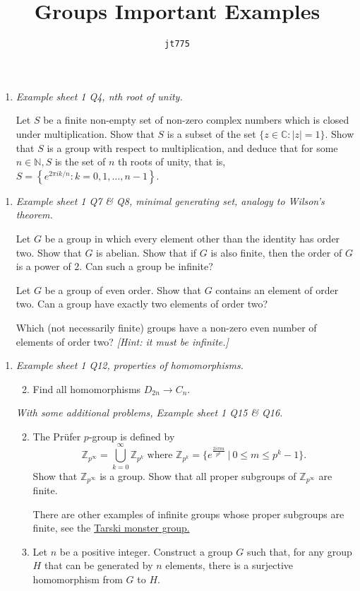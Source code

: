 \documentclass[11pt]{article}
\title{\textbf{Groups Important Examples}}
\author{\texttt{jt775}}
\date{\null}
\newlength{\qspace}
\newcounter{qnumber}
\newenvironment{question}%
 {\vspace{\qspace}
  \begin{enumerate}[\bfseries 1\quad][10]%
    \setcounter{enumi}{\value{qnumber}}%
    \item%
 }
{
  \end{enumerate}
  \filbreak
  \stepcounter{qnumber}
 }
\newenvironment{questionparts}[1][1]%
 {
  \begin{enumerate}[\bfseries (i)]%
    \setcounter{enumii}{#1}
    \addtocounter{enumii}{-1}
    \setlength{\parskip}{3pt}
 }
 {
  \end{enumerate}
 }
\def\le{\leqslant}
\begin{document}
\maketitle
\vspace{-1.5cm}

\begin{question}\textit{Example sheet 1 Q4, nth root of unity.}
    
    Let $S$ be a finite non-empty set of non-zero complex numbers which is closed under multiplication. Show that $S$ is a subset of the set $\{z \in \mathbb{C}:|z|=1\}$. Show that $S$ is a group with respect to multiplication, and deduce that for some $n \in \mathbb{N}, S$ is the set of $n$ th roots of unity, that is, $S=\left\{e^{2 \pi i k / n}: k=0,1, \ldots, n-1\right\}$.
\end{question}

\begin{question}\textit{Example sheet 1 Q7 \& Q8, minimal generating set, analogy to Wilson's theorem.}

  Let $G$ be a group in which every element other than the identity has order two. Show that $G$ is abelian. Show that if $G$ is also finite, then the order of $G$ is a power of 2. Can such a group be infinite?

  Let $G$ be a group of even order. Show that $G$ contains an element of order two. Can a group have exactly two elements of order two? 
  
  Which (not necessarily finite) groups have a non-zero even number of elements of order two? \textit{[Hint: it must be infinite.]}
\end{question}

\begin{question}\textit{Example sheet 1 Q12, properties of homomorphisms.}

  \begin{questionparts}
    \item Find all homomorphisms $ D_{2n}\to C_n $.
  \end{questionparts}

  \textit{With some additional problems, Example sheet 1 Q15 \& Q16.}

  \begin{questionparts}
    \setcounter{enumii}{1}
    \item The Pr\"{u}fer $p$-group is defined by
    \[
      \mathbb{Z}_{p^\infty}=\bigcup_{k=0}^\infty \mathbb{Z}_{p^k} \text{ where } \mathbb{Z}_{p^k}= \{e^{\frac{2 i \pi m}{p^k}} \ | \ 0 \le m \le p^k-1\}.
    \]
    Show that $ \mathbb{Z}_{p^\infty} $ is a group.
    Show that all proper subgroups of $ \mathbb{Z}_{p^\infty} $ are finite.

    There are other examples of infinite groups whose proper subgroups are finite, see the \href{https://planetmath.org/tarskigroup}{Tarski monster group.}
    \item Let $n$ be a positive integer. Construct a group $G$ such that, for any group $H$ that can be generated by $n$ elements, there is a surjective homomorphism from $G$ to $H$.
  \end{questionparts}
\end{question}
\end{document}
